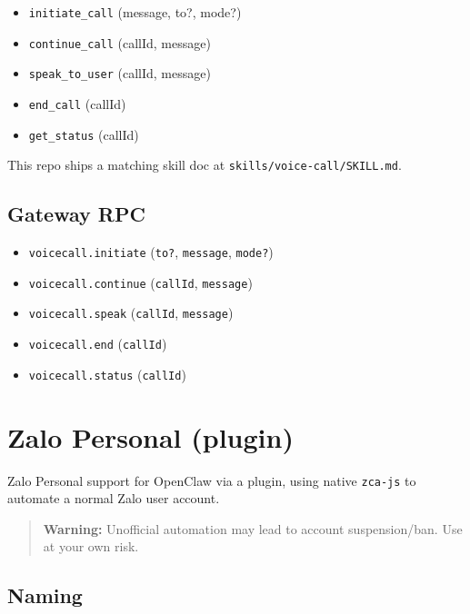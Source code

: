 \begin{itemize}
  \item \texttt{initiate\_call} (message, to?, mode?)
  \item \texttt{continue\_call} (callId, message)
  \item \texttt{speak\_to\_user} (callId, message)
  \item \texttt{end\_call} (callId)
  \item \texttt{get\_status} (callId)
\end{itemize}


This repo ships a matching skill doc at \texttt{skills/voice-call/SKILL.md}.

\subsection{Gateway RPC}


\begin{itemize}
  \item \texttt{voicecall.initiate} (\texttt{to?}, \texttt{message}, \texttt{mode?})
  \item \texttt{voicecall.continue} (\texttt{callId}, \texttt{message})
  \item \texttt{voicecall.speak} (\texttt{callId}, \texttt{message})
  \item \texttt{voicecall.end} (\texttt{callId})
  \item \texttt{voicecall.status} (\texttt{callId})
\end{itemize}



\clearpage

\section{Zalo Personal (plugin)}


Zalo Personal support for OpenClaw via a plugin, using native \texttt{zca-js} to automate a normal Zalo user account.

\begin{quote}
\textbf{Warning:} Unofficial automation may lead to account suspension/ban. Use at your own risk.
\end{quote}


\subsection{Naming}


